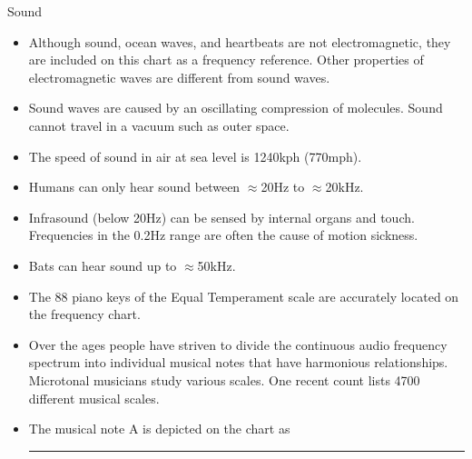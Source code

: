 {\Large Sound}
{
%
\begin{itemize}

\item Although sound, ocean waves, and heartbeats are not electromagnetic, they are included on this chart as a frequency reference. Other properties of electromagnetic waves are different from sound waves.

\item Sound waves are caused by an oscillating compression of molecules. Sound cannot travel in a vacuum such as outer space.

\item The speed of sound in air at sea level is 1240kph (770mph).

\item Humans can only hear sound between $\approx$20Hz to $\approx$20kHz.

\item Infrasound (below 20Hz) can be sensed by internal organs and touch.
%
Frequencies in the 0.2Hz range are often the cause of motion sickness.

\item Bats can hear sound up to $\approx$50kHz.

\item The 88 piano keys of the Equal Temperament scale are accurately located on the frequency chart.

\item Over the ages people have striven to divide the continuous audio frequency spectrum into individual musical notes that have harmonious relationships. Microtonal musicians study various scales. One recent count lists 4700 different musical scales.

\item The musical note A is depicted on the chart as \pscirclebox[fillstyle=solid,fillcolor=HumanAudioColor]{\textcolor{white}{A}}

\textcolor{gray}{\hrule}
\vspace{.1in}


\end{itemize}}
